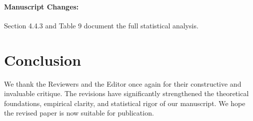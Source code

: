 \documentclass[runningheads]{llncs}
\begin{document}
\paragraph{Manuscript Changes:} Section 4.4.3 and Table 9 document the full statistical analysis.

\bigskip

\section*{Conclusion}

We thank the Reviewers and the Editor once again for their constructive and invaluable critique. The revisions have significantly strengthened the theoretical foundations, empirical clarity, and statistical rigor of our manuscript. We hope the revised paper is now suitable for publication.
\end{document}

